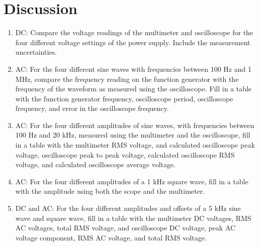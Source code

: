 \section{{\bf Discussion}}
\begin{enumerate}[resume]
\item DC: Compare the voltage readings of the multimeter and oscilloscope for the four different voltage settings of the power supply. Include the measurement uncertainties.

\item AC: For the four different sine waves with frequencies between 100 Hz and 1 MHz, compare the frequency reading on the function generator with the frequency of the waveform as measured using the oscilloscope. Fill in a table with the function generator frequency, oscilloscope period, oscilloscope frequency, and error in the oscilloscope frequency.

\item AC: For the four different amplitudes of sine waves, with frequencies between 100 Hz and 20 kHz, measured using the multimeter and the oscilloscope, fill in a table with the multimeter RMS voltage, and calculated oscilloscope peak voltage, oscilloscope peak to peak voltage, calculated oscilloscope RMS voltage, and calculated oscilloscope average voltage.

\item AC: For the four different amplitudes of a 1 kHz square wave, fill in a table with the amplitude using both the scope and the multimeter.

\item DC and AC: For the four different amplitudes and offsets of a 5 kHz sine wave and square wave, fill in a table with the multimeter DC voltages, RMS AC voltages, total RMS voltage, and oscilloscope DC voltage, peak AC voltage component, RMS AC voltage, and total RMS voltage.
\end{enumerate}


\AtEndDocument{\clearpage\ifodd\value{page}\else\null\clearpage\fi} %



